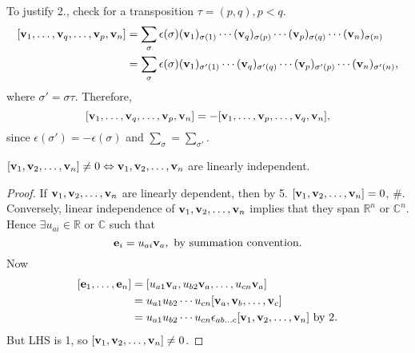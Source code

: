 \documentclass[10pt]{article}
\begin{document}
    To justify 2., check for a transposition $ \tau=(p,q), p<q$.
    \[
        \begin{aligned}
            [\bfv_1,\dots,\bfv_q,\dots,\bfv_p,\bfv_{n}]&=\sum_{\sigma}\epsilon(\sigma)(\bfv_1)_{\sigma(1)}\cdots (\bfv_q)_{\sigma(p)}\cdots(\bfv_p)_{\sigma(q)}\cdots (\bfv_n)_{\sigma(n)}\\
            &=\sum_{\sigma}\epsilon(\sigma)(\bfv_1)_{\sigma'(1)}\cdots (\bfv_q)_{\sigma'(q)}\cdots(\bfv_p)_{\sigma'(p)}\cdots (\bfv_n)_{\sigma'(n)},
        \end{aligned}
    \]
    where $ \sigma'=\sigma \tau $. Therefore, 
    \[
        [{\bf v}_1,\dots,{\bf v}_q,\dots,{\bf v}_p,{\bf v}_{n}] = -[{\bf v}_1,\dots,{\bf v}_p,\dots,{\bf v}_q,{\bf v}_{n}]
    ,\]
    since $ \epsilon(\sigma')=-\epsilon(\sigma) $ and $ \sum_{\sigma}=\sum_{\sigma'} $.
    \begin{proposition}
        $ [{\bf v}_1,{\bf v}_2,\dots,{\bf v}_n]\neq 0 \Leftrightarrow {\bf v}_1,{\bf v}_2,\dots,{\bf v}_n $ are linearly independent.
    \end{proposition}
    \begin{proof}
        If $ {\bf v}_1,{\bf v}_2,\dots,{\bf v}_n $ are linearly dependent, then by 5. $ [{\bf v}_1,{\bf v}_2,\dots,{\bf v}_n]=0 $, \#. Conversely, linear independence of $ {\bf v}_1,{\bf v}_2,\dots,{\bf v}_n $ implies that they span $ \mathbb{R}^{n} $ or $ \mathbb{C}^{n} $. Hence $ \exists u_{ai}\in \mathbb{R} \text{ or }\mathbb{C}  $ such that
        \[
            \mathbf{e}_i = u_{ai}{\bf v}_a,\text{ by summation convention}
        .\]
        Now 
        \[
            \begin{aligned}
                [\bfe_1,\dots,\bfe_n]&=[u_{a1}\bfv_a,u_{b2}\bfv_a,\dots, u_{cn}\bfv_a]\\
                &= u_{a1}u_{b2}\cdots u_{cn}[\bfv_a,\bfv_b,\dots,\bfv_c]\\
                &=u_{a1}u_{b2}\cdots u_{cn} \epsilon_{ab\dots c} [\bfv_1,\bfv_2,\dots,\bfv_n]\text{ by 2.}
            \end{aligned}
        \]
        But LHS is 1, so $ [{\bf v}_1,{\bf v}_2,\dots,{\bf v}_n]\neq 0 $.
    \end{proof}
\end{document}
